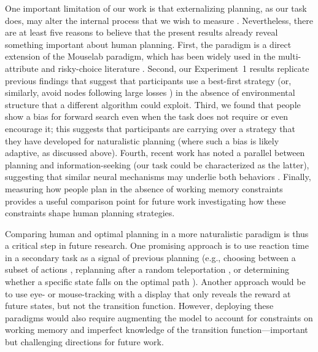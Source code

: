 One important limitation of our work is that externalizing planning, as our task does, may alter the internal process that we wish to measure \citep{lohse1996comparison}. Nevertheless, there are at least five reasons to believe that the present results already reveal something important about human planning. First, the paradigm is a direct extension of the Mouselab paradigm, which has been widely used in the multi-attribute and risky-choice literature \citep{payne1988adaptive,ford1989process,payne1993adaptive,gabaix2006costly,schulte-mecklenbeck2011visiting}. Second, our Experiment~1 results replicate previous findings that suggest that participants use a best-first strategy \citep{vanopheusden2017computational} (or, similarly, avoid nodes following large losses \citep{huys2012bonsai}) in the absence of environmental structure that a different algorithm could exploit. Third, we found that people show a bias for forward search even when the task does not require or even encourage it; this suggests that participants are carrying over a strategy that they have developed for naturalistic planning (where such a bias is likely adaptive, as discussed above). Fourth, recent work has noted a parallel between planning and information-seeking (our task could be characterized as the latter), suggesting that similar neural mechanisms may underlie both behaviors \citep{hunt2021formalizing}. Finally, measuring how people plan in the absence of working memory constraints provides a useful comparison point for future work investigating how these constraints shape human planning strategies.

Comparing human and optimal planning in a more naturalistic paradigm is thus a critical step in future research. One promising approach is to use reaction time in a secondary task as a signal of previous planning (e.g., choosing between a subset of actions \citep{ongchoco2019imagining}, replanning after a random teleportation \citep{ho2020efficiency}, or determining whether a specific state falls on the optimal path \citep{solway2014optimal}). Another approach would be to use eye- or mouse-tracking with a display that only reveals the reward at future states, but not the transition function. However, deploying these paradigms would also require augmenting the model to account for constraints on working memory and imperfect knowledge of the transition function---important but challenging directions for future work.

